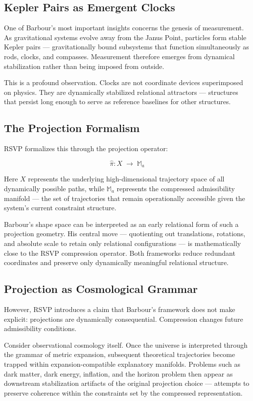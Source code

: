 \documentclass[12pt, a4paper]{article}
\newcommand{\proj}{\hat{\pi}}
\newcommand{\Madm}{\mathbb{M}_{a}}
\newcommand{\Xtraj}{X}
\begin{document}
\subsection{Kepler Pairs as Emergent Clocks}

One of Barbour's most important insights concerns the genesis of
measurement. As gravitational systems evolve away from the Janus Point,
particles form stable Kepler pairs — gravitationally bound subsystems that
function simultaneously as rods, clocks, and compasses. Measurement
therefore emerges from dynamical stabilization rather than being imposed
from outside.

This is a profound observation. Clocks are not coordinate devices
superimposed on physics. They are dynamically stabilized relational
attractors — structures that persist long enough to serve as reference
baselines for other structures.

\subsection{The Projection Formalism}

RSVP formalizes this through the projection operator:

\[
  \proj : \Xtraj \;\longrightarrow\; \Madm
\]

Here \(\Xtraj\) represents the underlying high-dimensional trajectory space
of all dynamically possible paths, while \(\Madm\) represents the compressed
admissibility manifold — the set of trajectories that remain operationally
accessible given the system's current constraint structure.

Barbour's shape space can be interpreted as an early relational form of such
a projection geometry. His central move — quotienting out translations,
rotations, and absolute scale to retain only relational configurations — is
mathematically close to the RSVP compression operator. Both frameworks
reduce redundant coordinates and preserve only dynamically meaningful
relational structure.

\subsection{Projection as Cosmological Grammar}

However, RSVP introduces a claim that Barbour's framework does not make
explicit: projections are dynamically consequential. Compression changes
future admissibility conditions.

Consider observational cosmology itself. Once the universe is interpreted
through the grammar of metric expansion, subsequent theoretical trajectories
become trapped within expansion-compatible explanatory manifolds. Problems
such as dark matter, dark energy, inflation, and the horizon problem then
appear as downstream stabilization artifacts of the original projection
choice — attempts to preserve coherence within the constraints set by the
compressed representation.
\end{document}
